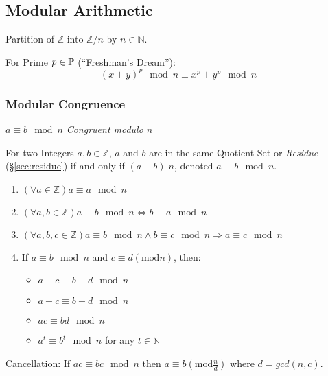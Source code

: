 \subsection{Modular Arithmetic}\label{sec:modular_arithmetic}

Partition of $\mathbb{Z}$ into $\mathbb{Z}/n$ by $n \in \mathbb{N}$.

For Prime $p \in \mathbb{P}$ (``Freshman's Dream''):
\[
  (x+y)^p \mod n \equiv x^p + y^p \mod n
\]



\subsubsection{Modular Congruence}\label{sec:modular_congruence}

$a \equiv b \mod n$ \emph{Congruent modulo $n$}

For two Integers $a,b \in \mathbb{Z}$, $a$ and $b$ are in the same
Quotient Set or \emph{Residue} (\S\ref{sec:residue}) if and only if
$(a - b)|n$, denoted $a \equiv b \mod n$.

\begin{enumerate}

  \item $(\forall a \in \mathbb{Z}) a \equiv a \mod n$

  \item $(\forall a,b \in \mathbb{Z}) a \equiv b \mod n
    \Leftrightarrow b \equiv a \mod n$

  \item $(\forall a,b,c \in \mathbb{Z}) a \equiv b \mod n
    \wedge b \equiv c \mod n \Rightarrow a \equiv c
    \mod n$

  \item
    If $a \equiv b \mod n$ and $c \equiv d (\mathrm{mod }
    n)$, then:
    \begin{itemize}
    \item $a + c \equiv b + d \mod n$
    \item $a - c \equiv b - d \mod n$
    \item $ac \equiv bd \mod n$
    \item $a^t \equiv b ^t \mod n$ for any $t \in
      \mathbb{N}$
    \end{itemize}

\end{enumerate}

Cancellation: If $ac \equiv bc \mod n$ then $a \equiv b
(\mathrm{mod } \frac{n}{d})$ where $d = gcd(n,c)$.



